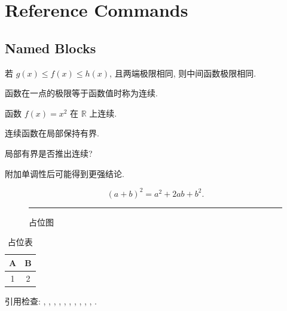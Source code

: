 \documentclass[a4paper,12pt,oneside]{maki-notes}
\begin{document}
\mainmatter

\chapter{Reference Commands}
\label{chap:refs}

\section{Named Blocks}
\label{sec:refs-blocks}

\begin{theorem}[夹逼准则]
\label{thm:squeeze}
若 \(g(x)\le f(x)\le h(x)\), 且两端极限相同, 则中间函数极限相同.
\end{theorem}

\begin{definition}[连续]
\label{def:continuous}
函数在一点的极限等于函数值时称为连续.
\end{definition}

\begin{example}[平方函数]
\label{ex:square}
函数 \(f(x)=x^2\) 在 \(\mathbb R\) 上连续.
\end{example}

\begin{claim}[局部结论]
\label{clm:local}
连续函数在局部保持有界.
\end{claim}

\begin{question}[反向问题]
\label{q:reverse}
局部有界是否推出连续?
\end{question}

\begin{conjecture}[示例猜想]
\label{conj:sample}
附加单调性后可能得到更强结论.
\end{conjecture}

\begin{equation}
\label{eq:identity}
  (a+b)^2=a^2+2ab+b^2.
\end{equation}

\begin{figure}[h]
  \centering
  \rule{2cm}{1cm}
  \caption{占位图}
  \label{fig:placeholder}
\end{figure}

\begin{table}[h]
  \centering
  \begin{tabular}{cc}
    \toprule
    A & B\\
    \midrule
    1 & 2\\
    \bottomrule
  \end{tabular}
  \caption{占位表}
  \label{tab:placeholder}
\end{table}

引用检查:
,
,
,
,
,
,
,
,
,
,
.
\end{document}
